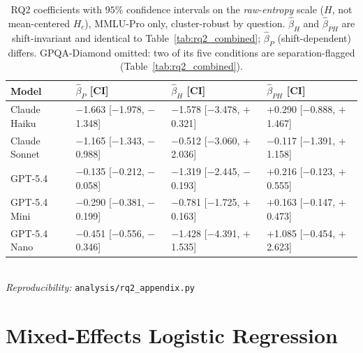 \begin{table}[t]
\centering
\small
\setlength{\tabcolsep}{1pt}
\renewcommand{\arraystretch}{1.0}
\caption{RQ2 coefficients with $95\%$ confidence intervals on the \emph{raw-entropy} scale ($H$, not mean-centered $H_c$), MMLU-Pro only, cluster-robust by question. $\hat\beta_H$ and $\hat\beta_{PH}$ are shift-invariant and identical to Table~\ref{tab:rq2_combined}; $\hat\beta_P$ (shift-dependent) differs. GPQA-Diamond omitted: two of its five conditions are separation-flagged (Table~\ref{tab:rq2_combined}).}
\label{tab:rq2_ci}
\begin{tabular}{llll}
\toprule
\textbf{Model} & $\hat\beta_P$ \tiny{[CI]} & $\hat\beta_H$ \tiny{[CI]} & $\hat\beta_{PH}$ \tiny{[CI]} \\
\midrule
Claude Haiku & $-$1.663 \tiny{[$-$1.978, $-$1.348]} & $-$1.578 \tiny{[$-$3.478, $+$0.321]} & $+$0.290 \tiny{[$-$0.888, $+$1.467]} \\
Claude Sonnet & $-$1.165 \tiny{[$-$1.343, $-$0.988]} & $-$0.512 \tiny{[$-$3.060, $+$2.036]} & $-$0.117 \tiny{[$-$1.391, $+$1.158]} \\
GPT-5.4 & $-$0.135 \tiny{[$-$0.212, $-$0.058]} & $-$1.319 \tiny{[$-$2.445, $-$0.193]} & $+$0.216 \tiny{[$-$0.123, $+$0.555]} \\
GPT-5.4 Mini & $-$0.290 \tiny{[$-$0.381, $-$0.199]} & $-$0.781 \tiny{[$-$1.725, $+$0.163]} & $+$0.163 \tiny{[$-$0.147, $+$0.473]} \\
GPT-5.4 Nano & $-$0.451 \tiny{[$-$0.556, $-$0.346]} & $-$1.428 \tiny{[$-$4.391, $+$1.535]} & $+$1.085 \tiny{[$-$0.454, $+$2.623]} \\
\bottomrule
\end{tabular}
\vspace{0.5pt}
{\footnotesize\\\emph{Reproducibility:} \texttt{analysis/rq2\_appendix.py}}
\end{table}


\section{Mixed-Effects Logistic Regression}
\label{app:mixed_effects}

